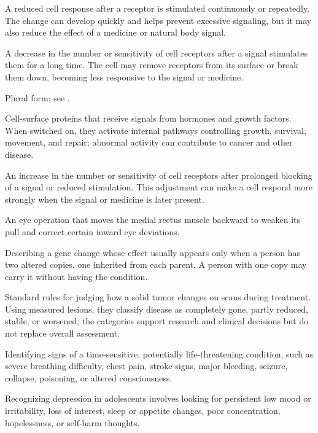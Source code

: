  A reduced cell response after a receptor is stimulated continuously or repeatedly. The change can develop quickly and helps prevent excessive signaling, but it may also reduce the effect of a medicine or natural body signal.

 A decrease in the number or sensitivity of cell receptors after a signal stimulates them for a long time. The cell may remove receptors from its surface or break them down, becoming less responsive to the signal or medicine.

 Plural form; see .

 Cell-surface proteins that receive signals from hormones and growth factors. When switched on, they activate internal pathways controlling growth, survival, movement, and repair; abnormal activity can contribute to cancer and other disease.

 An increase in the number or sensitivity of cell receptors after prolonged blocking of a signal or reduced stimulation. This adjustment can make a cell respond more strongly when the signal or medicine is later present.

 An eye operation that moves the medial rectus muscle backward to weaken its pull and correct certain inward eye deviations.

 Describing a gene change whose effect usually appears only when a person has two altered copies, one inherited from each parent. A person with one copy may carry it without having the condition.

 Standard rules for judging how a solid tumor changes on scans during treatment. Using measured lesions, they classify disease as completely gone, partly reduced, stable, or worsened; the categories support research and clinical decisions but do not replace overall assessment.

 Identifying signs of a time-sensitive, potentially life-threatening condition, such as severe breathing difficulty, chest pain, stroke signs, major bleeding, seizure, collapse, poisoning, or altered consciousness.

 Recognizing depression in adolescents involves looking for persistent low mood or irritability, loss of interest, sleep or appetite changes, poor concentration, hopelessness, or self-harm thoughts.

